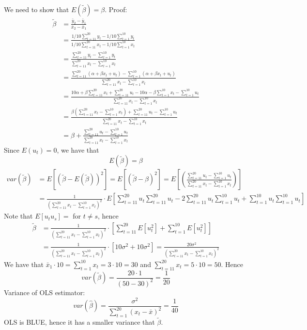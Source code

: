 \documentclass{article}
\begin{document}
\begin{Answer}
\Question
We need to show that $E(\tilde{\beta}) = \beta$. Proof:
\begin{align*}
\tilde{\beta} &= \frac{\bar{y}_2 - \bar{y}_1}{\bar{x}_2 - \bar{x}_1}\\
&= \frac{1/10 \sum_{t=11}^{20} y_t - 1/10 \sum_{t=1}^{10} y_t}{1/10 \sum_{t=11}^{20} x_t - 1/10 \sum_{t=1}^{10} x_t}\\
&= \frac{\sum_{t=11}^{20} y_t - \sum_{t=1}^{10} y_t}{\sum_{t=11}^{20} x_t - \sum_{t=1}^{10} x_t}\\
&= \frac{\sum_{t=11}^{20} (\alpha + \beta x_t + u_t) - \sum_{t=1}^{10} (\alpha + \beta x_t + u_t)}{\sum_{t=11}^{20} x_t - \sum_{t=1}^{10} x_t}\\
&= \frac{10\alpha + \beta \sum_{t=11}^{20} x_t + \sum_{t=11}^{20} u_t - 10 \alpha -\beta \sum_{t=1}^{10} x_t -\sum_{t=1}^{10} u_t}{\sum_{t=11}^{20} x_t - \sum_{t=1}^{10} x_t}\\
&= \frac{\beta (\sum_{t=11}^{20} x_t -\sum_{t=1}^{10} x_t) + \sum_{t=11}^{20} u_t  -\sum_{t=1}^{10} u_t}{\sum_{t=11}^{20} x_t - \sum_{t=1}^{10} x_t}\\
&= \beta + \frac{\sum_{t=11}^{20} u_t  -\sum_{t=1}^{10} u_t}{\sum_{t=11}^{20} x_t - \sum_{t=1}^{10} x_t}
\end{align*}
Since $E(u_t)=0$, we have that 
$$E(\tilde{\beta}) = \beta$$
\Question
\subQuestion
\begin{align*}
var(\tilde{\beta}) &= E[(\tilde{\beta}-E(\tilde{\beta}))^2] = E[(\tilde{\beta}-\beta)^2] = E\left[\left( \frac{\sum_{t=11}^{20} u_t  -\sum_{t=1}^{10} u_t}{\sum_{t=11}^{20} x_t - \sum_{t=1}^{10} x_t}\right)\right]\\
&=\frac{1}{(\sum_{t=11}^{20} x_t - \sum_{t=1}^{10} x_t)^2}\cdot E\left[\sum_{t=11}^{20}u_t\sum_{t=11}^{20}u_t - 2\sum_{t=11}^{20}u_t\sum_{t=1}^{10}u_t + \sum_{t=1}^{10}u_t\sum_{t=1}^{10}u_t\right]
\end{align*}
Note that $E[u_tu_s]=$ for $t\neq s$, hence
\begin{align*}
\tilde{\beta} &= \frac{1}{(\sum_{t=11}^{20} x_t - \sum_{t=1}^{10} x_t)^2}\cdot \left[\sum_{t=11}^{20}E[u_t^2] + \sum_{t=1}^{10}E[u_t^2]\right]\\
&= \frac{1}{(\sum_{t=11}^{20} x_t - \sum_{t=1}^{10} x_t)^2}\cdot \left[10\sigma^2+10\sigma^2\right] = \frac{20\sigma^2}{(\sum_{t=11}^{20} x_t - \sum_{t=1}^{10} x_t)^2}
\end{align*}
We have that $\bar{x}_1 \cdot 10 = \sum_{t=1}^{10} x_t = 3\cdot 10 = 30$ and $\sum_{t=11}^{20} x_t = 5 \cdot 10 = 50$. Hence
$$var(\tilde{\beta}) = \frac{20 \cdot 1}{(50-30)^2} = \frac{1}{20}$$
\subQuestion
Variance of OLS estimator: $$var(\hat{\beta}) = \frac{\sigma^2}{\sum_{t=1}^{20}(x_t-\bar{x})^2} = \frac{1}{40}$$
OLS is BLUE, hence it has a smaller variance that $\tilde{\beta}$.
\end{Answer}
\end{document}
